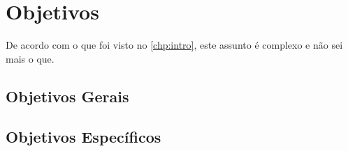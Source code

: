 \chapter{Objetivos}\label{chp:obj}

    De acordo com o que foi visto no \autoref{chp:intro}, este assunto é complexo e não sei mais o que.

    \lipsum[10-12]
  
    \section{Objetivos Gerais}\label{sec:objger}
    
        \lipsum[15]
  
    \section{Objetivos Específicos}\label{sec:objesp}
    
        \lipsum[18-20]
